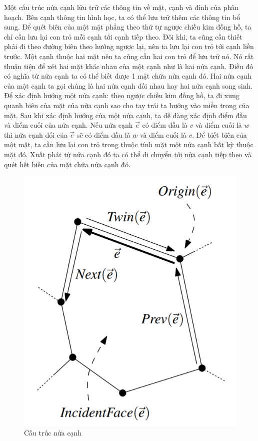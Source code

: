 \documentclass[15pt]{article}
\begin{document}
Một cấu trúc nửa cạnh lữu trữ các thông tin về mặt, cạnh và đỉnh của phân hoạch. Bên cạnh thông tin hình học, ta có thể lưu trữ thêm các thông tin bổ sung. Để quét biên của một mặt phẳng theo thứ tự ngược chiều kim đồng hồ, ta chỉ cần lưu lại con trỏ mỗi cạnh tới cạnh tiếp theo. Đôi khi, ta cũng cần thiết phải đi theo đường biên theo hướng ngược lại, nên ta lưu lại con trỏ tới cạnh liền trước. Một cạnh thuộc hai mặt nên ta cũng cần hai con trỏ để lưu trữ nó. Nó rất thuận tiện để xét hai mặt khác nhau của một cạnh như là hai nửa cạnh. Điều đó có nghĩa từ nửa cạnh ta có thể biết được 1 mặt chứa nửa cạnh đó. Hai nửa cạnh của một cạnh ta gọi chúng là hai nửa cạnh đối nhau hay hai nửa cạnh song sinh. Để xác định hướng một nửa cạnh: theo ngược chiều kim đồng hồ, ta đi xung quanh biên của mặt của nửa cạnh sao cho tay trái ta hướng vào miền trong của mặt. Sau khi xác định hướng của một nửa cạnh, ta dễ dàng xác định điểm đầu và điểm cuối của nửa cạnh. Nếu nửa cạnh $\vec{e}$ có điểm đầu là $v$ và điểm cuối là $w$ thì nửa cạnh đối của $\vec{e}$ sẽ có điểm đầu là $w$ và điểm cuối là $v$. Để biết biên của một mặt, ta cần lưu lại con trỏ trong thuộc tính mặt một nửa cạnh bất kỳ thuộc mặt đó. Xuất phát từ nửa cạnh đó ta có thể di chuyển tới nửa cạnh tiếp theo và quét hết biên của mặt chứa nửa cạnh đó. \\

\begin{figure}[h!]
\centering
\includegraphics[scale=0.38]{./dcel1.png}
\caption{Cấu trúc nửa cạnh}
\label{fig: cấu trức nửa cạnh}
\end{figure}
\end{document}
